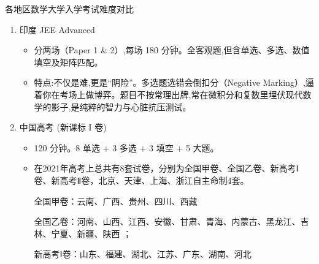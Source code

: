 \pagecolor{PageColor}
\begin{center}
  {\fontsize{30pt}{26pt}\selectfont 各地区数学大学入学考试难度对比
  }
\end{center}
\separator
\begin{enumerate}
\item 印度 JEE Advanced  %
\begin{itemize}
\item 分两场（Paper 1 \& 2）,每场 180 分钟。全客观题,但含单选、多选、数值填空及矩阵匹配。
\item 特点:不仅是难,更是“阴险”。多选题选错会倒扣分（Negative Marking）,逼着你在考场上做博弈。题目不按常理出牌,常在微积分和复数里埋伏现代数学的影子,是纯粹的智力与心脏抗压测试。
\end{itemize}
\item 中国高考 (新课标 I 卷) 
\begin{itemize}
    \item 120 分钟。8 单选 + 3 多选 + 3 填空 + 5 大题。
    \item 在2021年高考上总共有8套试卷，分别为全国甲卷、全国乙卷、新高考Ⅰ卷、新高考Ⅱ卷，北京、天津、上海、浙江自主命制4套。

全国甲卷：云南、广西、贵州、四川、西藏 

全国乙卷：河南、山西、江西、安徽、甘肃、青海、内蒙古、黑龙江、吉林、宁夏、新疆、陕西 ；

新高考Ⅰ卷：山东、福建、湖北、江苏、广东、湖南、河北


\end{itemize}
\end{enumerate}
